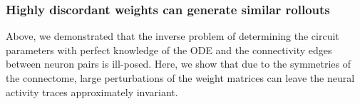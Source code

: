\documentclass{article}
\newcommand{\comment}[1]{\textcolor{orange}{[#1]}}
\def\vrest{V^{\mathrm{rest}}}
\begin{document}



\subsubsection*{Highly discordant weights can generate similar rollouts}

Above, we demonstrated that the inverse problem of determining the circuit parameters with perfect
knowledge of the ODE and the connectivity edges between neuron pairs is ill-posed. Here, we show that
due to the symmetries of the connectome, large perturbations of the weight matrices can leave the neural
activity traces approximately invariant.
\end{document}
